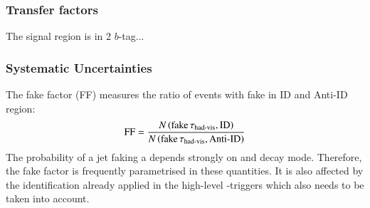 \subsubsection{Transfer factors}

The signal region is in 2 $b$-tag...

%
%
%
%
%
%



\subsubsection{Systematic Uncertainties}









The fake factor (FF) measures the ratio of events with fake \tauhadvis in ID and
Anti-ID region:
\begin{align*}
  \text{FF} = \frac{N\left( \text{fake} \, \tau_{\text{had-vis}}, \text{ID} \right)}{N\left( \text{fake} \, \tau_{\text{had-vis}}, \text{Anti-ID} \right)}
\end{align*}
The probability of a jet faking a \tauhadvis depends strongly on \tauhadvis \pT
and decay mode. Therefore, the fake factor is frequently parametrised in these
quantities. It is also affected by the \tauhadvis identification already applied
in the high-level \tauhadvis-triggers which also needs to be taken into account.

